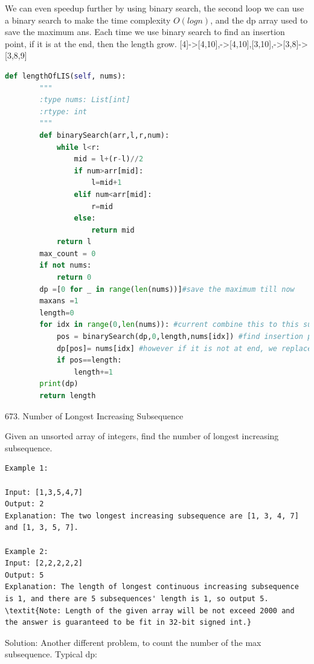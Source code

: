 \documentclass[../specific-algorithms.tex]{subfiles}
\begin{document}
We can even speedup further by using binary search, the second loop we can use a binary search to make the time complexity $O(logn)$, and the dp array used to save the maximum ans. Each time we use binary search to find an insertion point, if it is at the end, then the length grow.
[4]->[4,10],->[4,10],[3,10],->[3,8]->[3,8,9]
\begin{lstlisting}[language = Python]
def lengthOfLIS(self, nums):
        """
        :type nums: List[int]
        :rtype: int
        """
        def binarySearch(arr,l,r,num):
            while l<r:
                mid = l+(r-l)//2
                if num>arr[mid]:
                    l=mid+1
                elif num<arr[mid]:
                    r=mid
                else:
                    return mid
            return l
        max_count = 0
        if not nums:
            return 0
        dp =[0 for _ in range(len(nums))]#save the maximum till now
        maxans =1
        length=0
        for idx in range(0,len(nums)): #current combine this to this subsequence, 10 to [], 9 to [10]
            pos = binarySearch(dp,0,length,nums[idx]) #find insertion point
            dp[pos]= nums[idx] #however if it is not at end, we replace it, current number
            if pos==length:
                length+=1
        print(dp)            
        return length
\end{lstlisting}

673. Number of Longest Increasing Subsequence

Given an unsorted array of integers, find the number of longest increasing subsequence.
\begin{lstlisting}
Example 1:

Input: [1,3,5,4,7]
Output: 2
Explanation: The two longest increasing subsequence are [1, 3, 4, 7] and [1, 3, 5, 7].

Example 2:
Input: [2,2,2,2,2]
Output: 5
Explanation: The length of longest continuous increasing subsequence is 1, and there are 5 subsequences' length is 1, so output 5.
\textit{Note: Length of the given array will be not exceed 2000 and the answer is guaranteed to be fit in 32-bit signed int.}
\end{lstlisting}

Solution: Another different problem, to count the number of the max subsequence. Typical dp:
\end{document}
